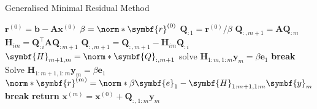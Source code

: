 \documentclass{article}
\begin{document}
\begin{algorithm}[H]
    \caption{Generalised Minimal Residual Method}
    \begin{algorithmic}
        \State \(\symbf{r}^{\left( 0 \right)} = \symbf{b} - \symbf{A} \symbf{x}^{\left( 0 \right)}\)
        \State \(\beta = \norm*{\symbf{r}^{\left( 0 \right)}}\)
        \State \(\symbf{Q}_{:1} = \symbf{r}^{\left( 0 \right)}/\beta\)
            \State \(\symbf{Q}_{:,m+1} = \symbf{A} \symbf{Q}_{:m}\) 
                \State \(\symbf{H}_{im} = \symbf{Q}_{:i}^\top \symbf{A} \symbf{Q}_{:m + 1}\)
                \State \(\symbf{Q}_{:,m+1} = \symbf{Q}_{:,m+1} - \symbf{H}_{im} \symbf{Q}_{:i}\)
            \EndFor
            \State \(\symbf{H}_{m+1,m} = \norm*{\symbf{Q}_{:,m+1}}\)
            \Statex
             
                \State solve \(\symbf{H}_{1:m,1:m} \symbf{y}_m = \beta \symbf{e}_1\)
                \State \textbf{break}
            \EndIf
            \Statex
            \State Solve \(\symbf{H}_{1:m+1,1:m} \symbf{y}_m = \beta \symbf{e}_1\) 
            \State \(\norm*{\symbf{r}^{\left( m \right)}} = \norm*{\beta \symbf{e}_1 - \symbf{H}_{1:m+1,1:m} \symbf{y}_m}\)
             
                \State \textbf{break}
            \EndIf
        \EndFor
        \State \textbf{return} \(\symbf{x}^{\left( m \right)} = \symbf{x}^{\left( 0 \right)} + \symbf{Q}_{:,1:m} \symbf{y}_m\)
    \end{algorithmic}
\end{algorithm}
\end{document}

